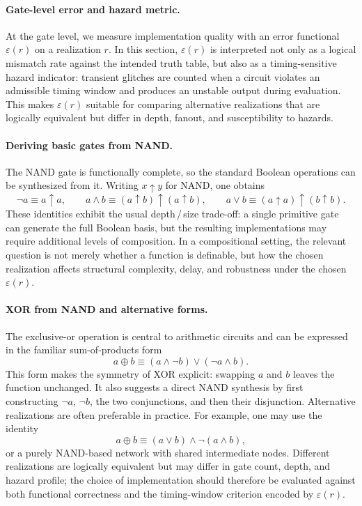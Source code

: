 \paragraph{Gate-level error and hazard metric.}
At the gate level, we measure implementation quality with an error functional \(\varepsilon(r)\) on a realization \(r\). In this section, \(\varepsilon(r)\) is interpreted not only as a logical mismatch rate against the intended truth table, but also as a timing-sensitive hazard indicator: transient glitches are counted when a circuit violates an admissible timing window and produces an unstable output during evaluation. This makes \(\varepsilon(r)\) suitable for comparing alternative realizations that are logically equivalent but differ in depth, fanout, and susceptibility to hazards.

\paragraph{Deriving basic gates from NAND.}
The NAND gate is functionally complete, so the standard Boolean operations can be synthesized from it. Writing \(x \uparrow y\) for NAND, one obtains
\[
\neg a \equiv a \uparrow a,
\qquad
 a \wedge b \equiv (a \uparrow b) \uparrow (a \uparrow b),
\qquad
 a \vee b \equiv (a \uparrow a) \uparrow (b \uparrow b).
\]
These identities exhibit the usual depth\,/\,size trade-off: a single primitive gate can generate the full Boolean basis, but the resulting implementations may require additional levels of composition. In a compositional setting, the relevant question is not merely whether a function is definable, but how the chosen realization affects structural complexity, delay, and robustness under the chosen \(\varepsilon(r)\).

\paragraph{XOR from NAND and alternative forms.}
The exclusive-or operation is central to arithmetic circuits and can be expressed in the familiar sum-of-products form
\[
 a \oplus b \equiv (a \wedge \neg b) \vee (\neg a \wedge b).
\]
This form makes the symmetry of XOR explicit: swapping \(a\) and \(b\) leaves the function unchanged. It also suggests a direct NAND synthesis by first constructing \(\neg a\), \(\neg b\), the two conjunctions, and then their disjunction. Alternative realizations are often preferable in practice. For example, one may use the identity
\[
 a \oplus b \equiv (a \vee b) \wedge \neg(a \wedge b),
\]
or a purely NAND-based network with shared intermediate nodes. Different realizations are logically equivalent but may differ in gate count, depth, and hazard profile; the choice of implementation should therefore be evaluated against both functional correctness and the timing-window criterion encoded by \(\varepsilon(r)\).

